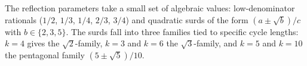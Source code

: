 \par
The reflection parameters take a small set of algebraic values:
low-denominator rationals ($1/2$, $1/3$, $1/4$, $2/3$, $3/4$) and
quadratic surds of the form $(a \pm \sqrt{b})/c$ with
$b \in \{2, 3, 5\}$. The surds fall into three families tied to
specific cycle lengths: $k = 4$ gives the $\sqrt{2}$-family,
$k = 3$ and $k = 6$ the $\sqrt{3}$-family, and $k = 5$ and
$k = 10$ the pentagonal family $(5 \pm \sqrt{5})/10$.
